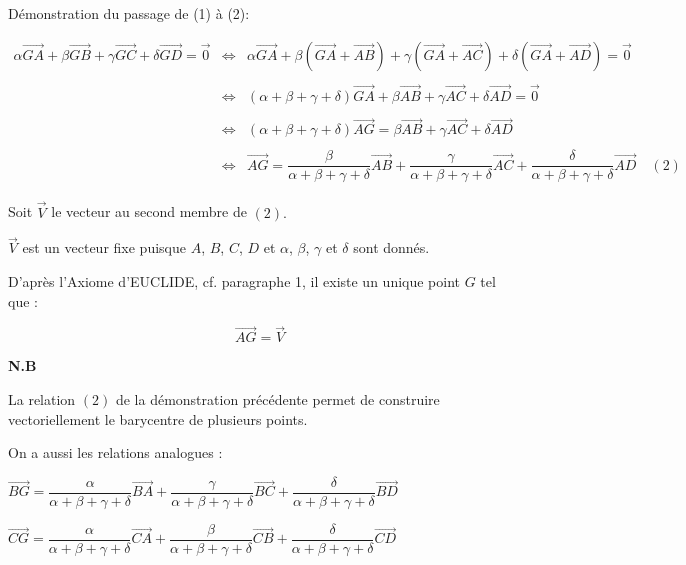 \documentclass{article}
\begin{document}
	Démonstration du passage de (1) à (2):
	
	$\begin{array}{rcl} \alpha\overrightarrow{GA}+\beta\overrightarrow{GB}+\gamma\overrightarrow{GC}+\delta\overrightarrow{GD}=\vec{0} & \Leftrightarrow & \alpha\overrightarrow{GA}+\beta\left(\overrightarrow{GA}+\overrightarrow{AB}\right)+\gamma\left(\overrightarrow{GA}+\overrightarrow{AC}\right)+\delta\left(\overrightarrow{GA}+\overrightarrow{AD}\right)=\vec{0}\\\\ & \Leftrightarrow & (\alpha+\beta+\gamma+\delta)\overrightarrow{GA}+\beta\overrightarrow{AB}+\gamma\overrightarrow{AC}+\delta\overrightarrow{AD}=\overrightarrow{0}\\\\ & \Leftrightarrow & (\alpha+\beta+\gamma+\delta)\overrightarrow{AG}=\beta\overrightarrow{AB}+\gamma\overrightarrow{AC}+\delta\overrightarrow{AD}\\\\ & \Leftrightarrow & \overrightarrow{AG}=\dfrac{\beta}{\alpha+\beta+\gamma+\delta}\overrightarrow{AB}+\dfrac{\gamma}{\alpha+\beta+\gamma+\delta}\overrightarrow{AC}+\dfrac{\delta} {\alpha+\beta+\gamma+\delta}\overrightarrow{AD}\quad(2)\end{array}$
	
	Soit $\overrightarrow{V}$ le vecteur au second membre de $(2).$
	
	$\overrightarrow{V}$ est un vecteur fixe puisque $A$, $B$, $C$, $D$ et $\alpha$, $\beta$, $\gamma$ et $\delta$ sont donnés.
	
	D'après l'Axiome d'EUCLIDE, cf. paragraphe 1, il existe un unique point $G$ tel que :
	
	$$\overrightarrow{AG}=\overrightarrow{V}$$
	
	\textbf{N.B}

	La relation $(2)$ de la démonstration précédente permet de construire vectoriellement le barycentre de plusieurs points.

	On a aussi les relations analogues :
	
		$\overrightarrow{BG}=\dfrac{\alpha}{\alpha+\beta+\gamma+\delta}\overrightarrow{BA}+\dfrac{\gamma}{\alpha+\beta+\gamma+\delta}\overrightarrow{BC}+\dfrac{\delta}{\alpha+\beta+\gamma+\delta}\overrightarrow{BD}$
		
		$\overrightarrow{CG}=\dfrac{\alpha}{\alpha+\beta+\gamma+\delta}\overrightarrow{CA}+\dfrac{\beta}{\alpha+\beta+\gamma+\delta}\overrightarrow{CB}+\dfrac{\delta}{\alpha+\beta+\gamma+\delta}\overrightarrow{CD}$
		
\end{document}
